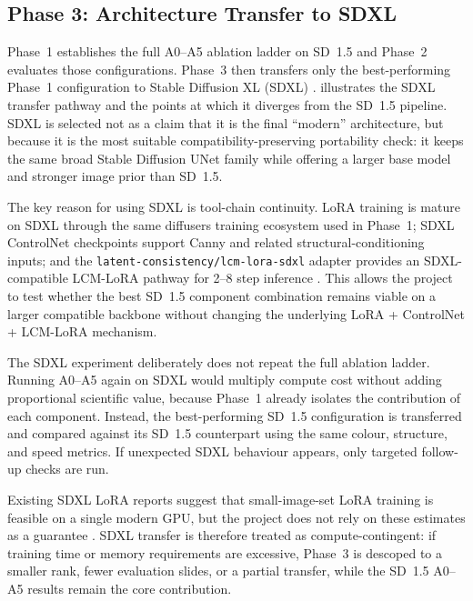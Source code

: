 \documentclass[a4paper,twoside,12pt]{report}
\begin{document}
\subsection{Phase 3: Architecture Transfer to SDXL}
\label{sec:phase3_sdxl}

Phase~1 establishes the full A0--A5 ablation ladder on SD~1.5 and Phase~2 evaluates those configurations. Phase~3 then transfers only the best-performing Phase~1 configuration to Stable Diffusion XL (SDXL) \citep{podell2023sdxl}.  illustrates the SDXL transfer pathway and the points at which it diverges from the SD~1.5 pipeline. SDXL is selected not as a claim that it is the final ``modern'' architecture, but because it is the most suitable compatibility-preserving portability check: it keeps the same broad Stable Diffusion UNet family while offering a larger base model and stronger image prior than SD~1.5.

The key reason for using SDXL is tool-chain continuity. LoRA training is mature on SDXL through the same diffusers training ecosystem used in Phase~1; SDXL ControlNet checkpoints support Canny and related structural-conditioning inputs; and the \texttt{latent-consistency/lcm-lora-sdxl} adapter provides an SDXL-compatible LCM-LoRA pathway for 2--8 step inference \citep{luo2023lcmlora}. This allows the project to test whether the best SD~1.5 component combination remains viable on a larger compatible backbone without changing the underlying LoRA + ControlNet + LCM-LoRA mechanism.

The SDXL experiment deliberately does not repeat the full ablation ladder. Running A0--A5 again on SDXL would multiply compute cost without adding proportional scientific value, because Phase~1 already isolates the contribution of each component. Instead, the best-performing SD~1.5 configuration is transferred and compared against its SD~1.5 counterpart using the same colour, structure, and speed metrics. If unexpected SDXL behaviour appears, only targeted follow-up checks are run.

Existing SDXL LoRA reports suggest that small-image-set LoRA training is feasible on a single modern GPU, but the project does not rely on these estimates as a guarantee \citep{salad2024sdxl}. SDXL transfer is therefore treated as compute-contingent: if training time or memory requirements are excessive, Phase~3 is descoped to a smaller rank, fewer evaluation slides, or a partial transfer, while the SD~1.5 A0--A5 results remain the core contribution.
\end{document}
